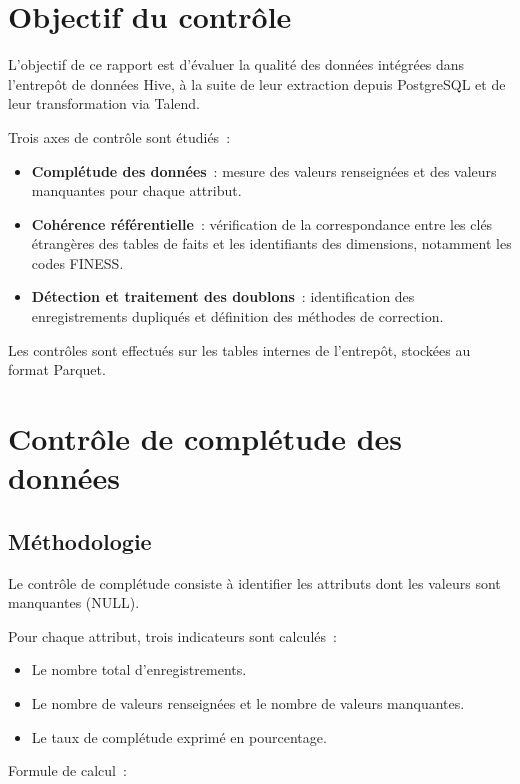 \newpage
\section{Objectif du contrôle}

\noindent L'objectif de ce rapport est d'évaluer la qualité des données intégrées dans l'entrepôt de données Hive, à la suite de leur extraction depuis PostgreSQL et de leur transformation via Talend.

\noindent Trois axes de contrôle sont étudiés~:
\begin{itemize}
	\item \textbf{Complétude des données}~: mesure des valeurs renseignées et des valeurs manquantes pour chaque attribut.
	\item \textbf{Cohérence référentielle}~: vérification de la correspondance entre les clés étrangères des tables de faits et les identifiants des dimensions, notamment les codes FINESS.
	\item \textbf{Détection et traitement des doublons}~: identification des enregistrements dupliqués et définition des méthodes de correction.
\end{itemize}

\noindent Les contrôles sont effectués sur les tables internes de l'entrepôt, stockées au format Parquet.

\section{Contrôle de complétude des données}

\subsection{Méthodologie}

\noindent Le contrôle de complétude consiste à identifier les attributs dont les valeurs sont manquantes (NULL).

\noindent Pour chaque attribut, trois indicateurs sont calculés~:
\begin{itemize}
	\item Le nombre total d'enregistrements.
	\item Le nombre de valeurs renseignées et le nombre de valeurs manquantes.
	\item Le taux de complétude exprimé en pourcentage.
\end{itemize}

\noindent Formule de calcul~:

